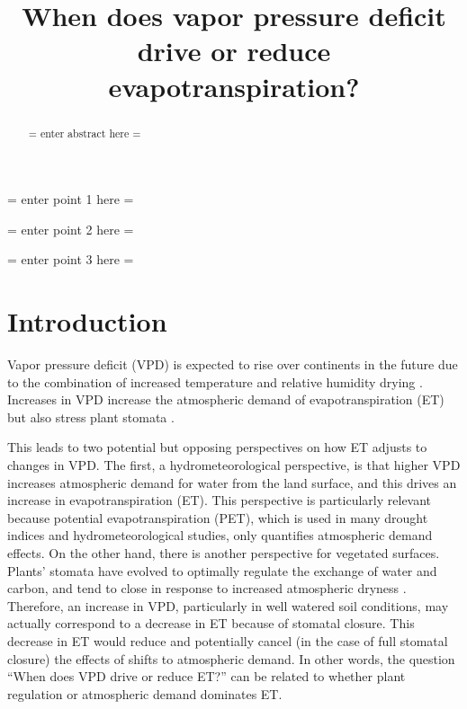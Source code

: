 \documentclass[draft,linenumbers]{agujournal}
\begin{document}
\title{When does vapor pressure deficit drive or reduce evapotranspiration?}





\begin{keypoints}
\item = enter point 1 here = 
\item = enter point 2 here = 
\item = enter point 3 here = 
\end{keypoints}


\begin{abstract}
= enter abstract here =
\end{abstract}

\section{Introduction}

Vapor pressure deficit (VPD) is expected to rise over continents in the future due to the combination of increased temperature and relative humidity drying \citep{Byrne_2013}. Increases in VPD increase the atmospheric demand of evapotranspiration (ET) \citep{Monteith_1965} but also stress plant stomata \citep{Leuning_1990, MEDLYN_2011}.

This leads to two potential but opposing perspectives on how ET adjusts to changes in VPD. The first, a hydrometeorological perspective, is that higher VPD increases atmospheric demand for water from the land surface, and this drives an increase in evapotranspiration (ET). This perspective is particularly relevant because potential evapotranspiration (PET), which is used in many drought indices and hydrometeorological studies, only quantifies atmospheric demand effects. On the other hand, there is another perspective for vegetated surfaces. Plants' stomata have evolved to optimally regulate the exchange of water and carbon, and tend to close in response to increased atmospheric dryness \citep{Ball_1987, Leuning_1990, MEDLYN_2011}.  Therefore, an increase in VPD, particularly in well watered soil conditions, may actually correspond to a decrease in ET because of stomatal closure. This decrease in ET would reduce and potentially cancel (in the case of full stomatal closure) the effects of shifts to atmospheric demand. In other words, the  question ``When does VPD drive or reduce ET?'' can be related to whether plant regulation or atmospheric demand dominates ET.
\end{document}
